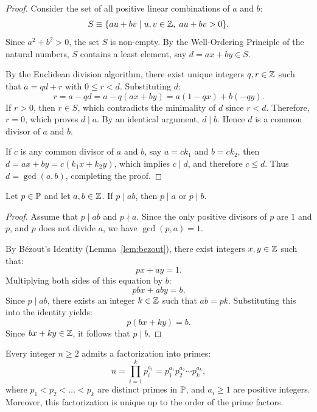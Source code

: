 \begin{proof}
\leanok
Consider the set of all positive linear combinations of $a$ and $b$:
$$S \equiv \{a u + b v \mid u, v \in \mathbb{Z}, \; a u + b v > 0\}.$$
Since $a^2 + b^2 > 0$, the set $S$ is non-empty. By the Well-Ordering Principle of the natural numbers, $S$ contains a least element, say $d = a x + b y \in S$. 

By the Euclidean division algorithm, there exist unique integers $q, r \in \mathbb{Z}$ such that $a = q d + r$ with $0 \le r < d$. Substituting $d$:
$$r = a - q d = a - q(a x + b y) = a(1 - q x) + b(-q y).$$
If $r > 0$, then $r \in S$, which contradicts the minimality of $d$ since $r < d$. Therefore, $r = 0$, which proves $d \mid a$. By an identical argument, $d \mid b$. Hence $d$ is a common divisor of $a$ and $b$.

If $c$ is any common divisor of $a$ and $b$, say $a = c k_1$ and $b = c k_2$, then $d = a x + b y = c(k_1 x + k_2 y)$, which implies $c \mid d$, and therefore $c \le d$. Thus $d = \gcd(a, b)$, completing the proof.
\end{proof}

\begin{lemma}
\label{lem:euclid}
\leanok
Let $p \in \mathbb{P}$ and let $a, b \in \mathbb{Z}$. If $p \mid a b$, then $p \mid a$ or $p \mid b$.
\end{lemma}

\begin{proof}
\leanok
Assume that $p \mid a b$ and $p \nmid a$. Since the only positive divisors of $p$ are $1$ and $p$, and $p$ does not divide $a$, we have $\gcd(p, a) = 1$. 

By B\'ezout's Identity (Lemma~\ref{lem:bezout}), there exist integers $x, y \in \mathbb{Z}$ such that:
$$p x + a y = 1.$$
Multiplying both sides of this equation by $b$:
$$p b x + a b y = b.$$
Since $p \mid a b$, there exists an integer $k \in \mathbb{Z}$ such that $a b = p k$. Substituting this into the identity yields:
$$p(b x + k y) = b.$$
Since $b x + k y \in \mathbb{Z}$, it follows that $p \mid b$.
\end{proof}

\begin{theorem}
\label{thm:fta}
\leanok
Every integer $n \ge 2$ admits a factorization into primes:
\begin{equation}
\label{eq:fta_factorization}
n = \prod_{i=1}^k p_i^{a_i} = p_1^{a_1} p_2^{a_2} \cdots p_k^{a_k},
\end{equation}
where $p_1 < p_2 < \dots < p_k$ are distinct primes in $\mathbb{P}$, and $a_i \ge 1$ are positive integers. Moreover, this factorization is unique up to the order of the prime factors.
\end{theorem}

